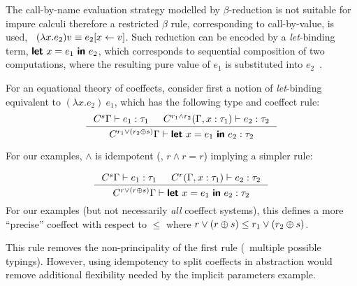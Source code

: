 The call-by-name evaluation strategy modelled by $\beta$-reduction is
not suitable for impure calculi therefore a restricted $\beta$ rule,
corresponding to call-by-value, is used, \ie~$(\lambda x . e_2) v
\equiv e_2[x \leftarrow v]$. Such reduction can be encoded by a
\emph{let}-binding term, $\kvd{let}~x=e_1~\kvd{in}~e_2$, which
corresponds to sequential composition of two computations, where the
resulting pure value of $e_1$ is substituted into
$e_2$~\cite{monads-inaction,monad-notions}.

%
% 

For an equational theory of coeffects, consider first a notion 
of \emph{let}-binding equivalent to $(\lambda x . e_2)~e_1$, which
has the following type and coeffect rule:
%
\begin{equation}
\inference
  {\ctyp{s}{\Gamma} \vdash e_1 : \tau_1 &
   \ctyp{r_1 \wedge r_2}{(\Gamma, x : \tau_1)} \vdash e_2 : \tau_2}
  {\ctyp{r_1 \vee (r_2 \imult s)}{\Gamma} \vdash \kvd{let}~x = e_1~\kvd{in}~e_2
: \tau_2 }
\label{eq:let1}
\end{equation}

\noindent
For our examples, $\wedge$ is idempotent (\ie{}, $r \wedge r = r$)
implying a simpler rule:

%
\begin{equation}
\inference
  {\ctyp{s}{\Gamma} \vdash e_1 : \tau_1 &
   \ctyp{r}{(\Gamma, x : \tau_1)} \vdash e_2 : \tau_2}
  {\ctyp{r \vee (r \imult s)}{\Gamma} \vdash \kvd{let}~x = e_1~\kvd{in}~e_2 : \tau_2 }
\label{eq:let2}
\end{equation}
For our examples (but not necessarily \emph{all} coeffect
systems), this defines a more ``precise'' coeffect with respect to $\leq$
where $r \vee (r \oplus s) \leq r_1 \vee (r_2 \oplus s)$.

This rule removes the non-principality of the first rule
(\ie~multiple possible typings).  However, using idempotency 
to split coeffects in abstraction would remove additional
flexibility needed by the implicit parameters example.

